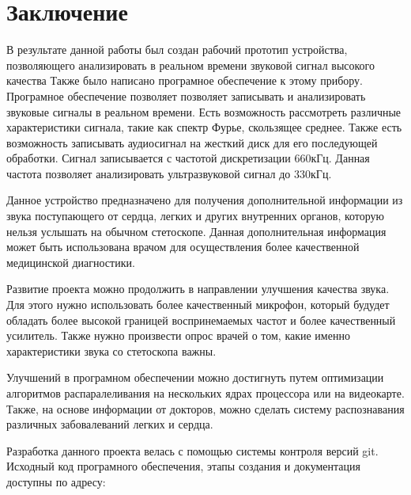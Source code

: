 \documentclass[../main.tex]{subfiles}
\begin{document}
\section*{Заключение}
%

В результате данной работы был создан рабочий прототип устройства, позволяющего анализировать в реальном времени звуковой сигнал высокого качества Также было написано програмное обеспечение к этому прибору. Програмное обеспечение позволяет позволяет записывать и анализировать звуковые сигналы в реальном времени. Есть возможность рассмотреть различные характеристики сигнала, такие как спектр Фурье, скользящее среднее. Также есть возможность записывать аудиосигнал на жесткий диск для его последующей обработки. Сигнал записывается с частотой дискретизации 660кГц. Данная частота позволяет анализировать ультразвуковой сигнал до 330кГц.

Данное устройство предназначено для получения дополнительной информации из звука поступающего от сердца, легких и других внутренних органов, которую нельзя услышать на обычном стетоскопе. Данная дополнительная информация может быть использована врачом для осуществления более качественной медицинской диагностики.

Развитие проекта можно продолжить в направлении улучшения качества звука. Для этого нужно использовать более качественный микрофон, который будудет обладать более высокой границей воспринемаемых частот и более качественный усилитель. Также нужно произвести опрос врачей о том, какие именно характеристики звука со стетоскопа важны.

Улучшений в програмном обеспечении можно достигнуть путем оптимизации алгоритмов распаралеливания на нескольких ядрах процессора или на видеокарте. Также, на основе информации от докторов, можно сделать систему распознавания различных забовалеваний легких и сердца.

Разработка данного проекта велась с помощью системы контроля версий git. Исходный код програмного обеспечения, этапы создания и документация доступны по адресу: \cite{github}
\newpage
\end{document}
